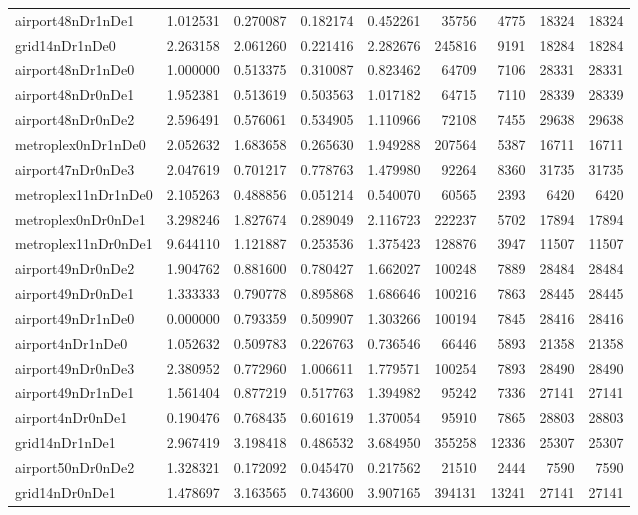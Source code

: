 \documentclass[../../../thesis.tex]{subfiles}
\begin{document}
\begin{longtable}{|l|r|r|r|r|r|r|r|r|}
airport48nDr1nDe1 & 1.012531 & 0.270087 & 0.182174 & 0.452261 & 35756 & 4775 & 18324 & 18324 \\
grid14nDr1nDe0 & 2.263158 & 2.061260 & 0.221416 & 2.282676 & 245816 & 9191 & 18284 & 18284 \\
airport48nDr1nDe0 & 1.000000 & 0.513375 & 0.310087 & 0.823462 & 64709 & 7106 & 28331 & 28331 \\
airport48nDr0nDe1 & 1.952381 & 0.513619 & 0.503563 & 1.017182 & 64715 & 7110 & 28339 & 28339 \\
airport48nDr0nDe2 & 2.596491 & 0.576061 & 0.534905 & 1.110966 & 72108 & 7455 & 29638 & 29638 \\
metroplex0nDr1nDe0 & 2.052632 & 1.683658 & 0.265630 & 1.949288 & 207564 & 5387 & 16711 & 16711 \\
airport47nDr0nDe3 & 2.047619 & 0.701217 & 0.778763 & 1.479980 & 92264 & 8360 & 31735 & 31735 \\
metroplex11nDr1nDe0 & 2.105263 & 0.488856 & 0.051214 & 0.540070 & 60565 & 2393 & 6420 & 6420 \\
metroplex0nDr0nDe1 & 3.298246 & 1.827674 & 0.289049 & 2.116723 & 222237 & 5702 & 17894 & 17894 \\
metroplex11nDr0nDe1 & 9.644110 & 1.121887 & 0.253536 & 1.375423 & 128876 & 3947 & 11507 & 11507 \\
airport49nDr0nDe2 & 1.904762 & 0.881600 & 0.780427 & 1.662027 & 100248 & 7889 & 28484 & 28484 \\
airport49nDr0nDe1 & 1.333333 & 0.790778 & 0.895868 & 1.686646 & 100216 & 7863 & 28445 & 28445 \\
airport49nDr1nDe0 & 0.000000 & 0.793359 & 0.509907 & 1.303266 & 100194 & 7845 & 28416 & 28416 \\
airport4nDr1nDe0 & 1.052632 & 0.509783 & 0.226763 & 0.736546 & 66446 & 5893 & 21358 & 21358 \\
airport49nDr0nDe3 & 2.380952 & 0.772960 & 1.006611 & 1.779571 & 100254 & 7893 & 28490 & 28490 \\
airport49nDr1nDe1 & 1.561404 & 0.877219 & 0.517763 & 1.394982 & 95242 & 7336 & 27141 & 27141 \\
airport4nDr0nDe1 & 0.190476 & 0.768435 & 0.601619 & 1.370054 & 95910 & 7865 & 28803 & 28803 \\
grid14nDr1nDe1 & 2.967419 & 3.198418 & 0.486532 & 3.684950 & 355258 & 12336 & 25307 & 25307 \\
airport50nDr0nDe2 & 1.328321 & 0.172092 & 0.045470 & 0.217562 & 21510 & 2444 & 7590 & 7590 \\
grid14nDr0nDe1 & 1.478697 & 3.163565 & 0.743600 & 3.907165 & 394131 & 13241 & 27141 & 27141 \\

\end{longtable}
\end{document}
